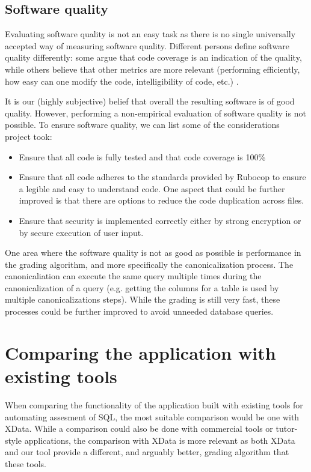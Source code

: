 \subsection{Software quality}

Evaluating software quality is not an easy task as there is no single universally accepted way of measuring software quality. Different persons define software quality differently: some argue that code coverage is an indication of the quality, while others believe that other metrics are more relevant (performing efficiently, how easy can one modify the code, intelligibility of code, etc.) \citep{msft_testing, Boehm:1976:QES:800253.807736}.

It is our (highly subjective) belief that overall the resulting software is of good quality. However, performing a non-empirical evaluation of software quality is not possible. To ensure software quality, we can list some of the considerations project took:
\begin{itemize}
    \item Ensure that all code is fully tested and that code coverage is 100\%
    \item Ensure that all code adheres to the standards provided by Rubocop to ensure a legible and easy to understand code. One aspect that could be further improved is that there are options to reduce the code duplication across files.
    \item Ensure that security is implemented correctly either by strong encryption or by secure execution of user input.
\end{itemize}

One area where the software quality is not as good as possible is performance in the grading algorithm, and more specifically the canonicalization process. The canonicaliation can execute the same query multiple times during the canonicalization of a query (e.g. getting the columns for a table is used by multiple canonicalizations steps). While the grading is still very fast, these processes could be further improved to avoid unneeded database queries.

\section{Comparing the application with existing tools}

When comparing the functionality of the application built with existing tools for automating assesment of SQL, the most suitable comparison would be one with XData. While a comparison could also be done with commercial tools or tutor-style applications, the comparison with XData is more relevant as both XData and our tool provide a different, and arguably better, grading algorithm that these tools.

